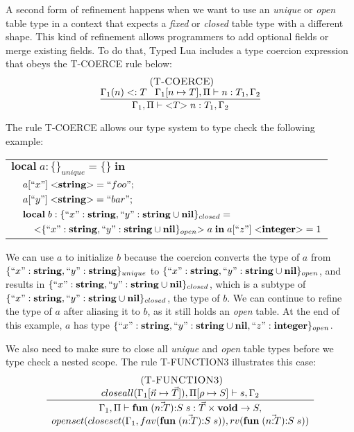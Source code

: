 A second form of refinement happens when we want to use an
\emph{unique} or \emph{open} table type in a context that expects a
\emph{fixed} or \emph{closed} table type with a different shape.
This kind of refinement allows programmers to add optional fields
or merge existing fields.
To do that, Typed Lua includes a type coercion expression that
obeys the \textsc{T-COERCE} rule below:
\[
\begin{array}{c}
\; (\textsc{T-COERCE})\\
\dfrac{\Gamma_{1}(n) <: T \;\;\;
       \Gamma_{1}[n \mapsto T], \Pi \vdash n:T_{1}, \Gamma_{2}}
      {\Gamma_{1}, \Pi \vdash {<}T{>} \; n:T_{1}, \Gamma_{2}}
\end{array}
\]

The rule \textsc{T-COERCE} allows our type system to type check the following example:
\begin{center}
\begin{tabular}{lll}
\multicolumn{3}{l}{$\mathbf{local} \; a:\{\}_{unique} = \{ \} \; \mathbf{in}$}\\
& \multicolumn{2}{l}{$a[``x"] \; {<}\mathbf{string}{>} = ``foo";$}\\
& \multicolumn{2}{l}{$a[``y"] \; {<}\mathbf{string}{>} = ``bar";$}\\
& \multicolumn{2}{l}{$\mathbf{local} \; b:\{``x":\mathbf{string}, ``y":\mathbf{string} \cup \mathbf{nil} \}_{closed} =$}\\
& & \multicolumn{1}{l}{${<}\{``x":\mathbf{string}, ``y":\mathbf{string} \cup \mathbf{nil}\}_{open}{>} \; a \; \mathbf{in} \; a[``z"] \; {<}\mathbf{integer}{>} = 1$}
\end{tabular}
\end{center}

We can use $a$ to initialize $b$ because the coercion converts
the type of $a$ from $\{``x":\mathbf{string}, ``y":\mathbf{string}\}_{unique}$ to
$\{``x":\mathbf{string}, ``y":\mathbf{string} \cup \mathbf{nil}\}_{open}$, and results in
$\{``x":\mathbf{string}, ``y":\mathbf{string} \cup \mathbf{nil}\}_{closed}$,
which is a subtype of
$\{``x":\mathbf{string}, ``y":\mathbf{string} \cup \mathbf{nil}\}_{closed}$, the type of $b$.
We can continue to refine the type of $a$ after aliasing it to $b$,
as it still holds an \emph{open} table.
At the end of this example, $a$ has type
$\{``x":\mathbf{string}, ``y":\mathbf{string} \cup \mathbf{nil}, ``z":\mathbf{integer}\}_{open}$.

We also need to make sure to close all \emph{unique} and \emph{open}
table types before we type check a nested scope.
The rule \textsc{T-FUNCTION3} illustrates this case:
\[
\begin{array}{c}
\; (\textsc{T-FUNCTION3})\\
\dfrac{closeall(\Gamma_{1}[\vec{n} \mapsto \vec{T}]), \Pi[\rho \mapsto S] \vdash s, \Gamma_{2}}
      {\begin{array}{c}
       \Gamma_{1}, \Pi \vdash \mathbf{fun} \; (\vec{n{:}T}){:}S \; s:\vec{T} \times \mathbf{void} \rightarrow S,\\
       openset(closeset(\Gamma_{1}, fav(\mathbf{fun} \; (\vec{n{:}T}){:}S \; s)),rv(\mathbf{fun} \; (\vec{n{:}T}){:}S \; s))
       \end{array}}
\end{array}
\]

